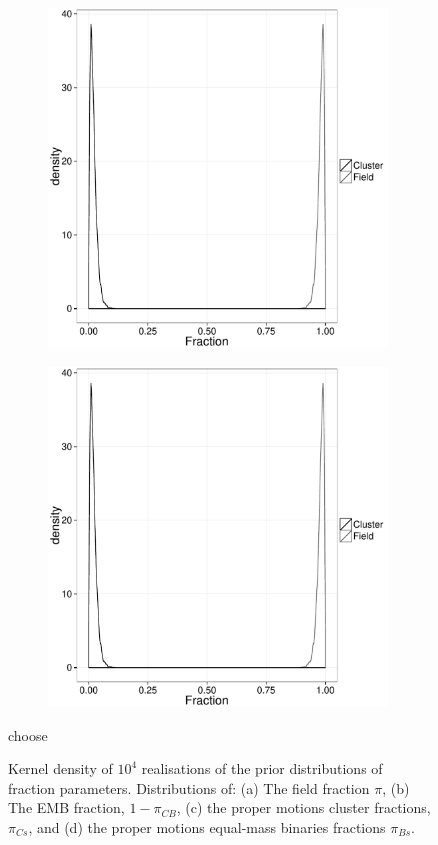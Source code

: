 \begin{figure}[ht!]
\begin{subfigure}[t]{0.48\textwidth}
        \caption{}
        \label{} 
    \end{subfigure}
     \begin{subfigure}[t]{0.48\textwidth}
      \includegraphics[page=3,height=9cm,width=\textwidth]{background/Figures/Priors.pdf}
        \caption{}
        \label{} 
    \end{subfigure}
     \begin{subfigure}[t]{0.48\textwidth}
      \includegraphics[page=4,height=9cm,width=\textwidth]{background/Figures/Priors.pdf}
        \caption{}
        \label{} 
    \end{subfigure}
\caption{Kernel density of $10^4$ realisations of the prior distributions of fraction parameters. Distributions of: (a) The field fraction $\pi$, (b) The EMB fraction, $1-\pi_{CB}$, (c) the proper motions cluster fractions, $\pi_{Cs}$, and (d) the proper motions equal-mass binaries fractions $\pi_{Bs}$.}
\label{figure:priors}choose
\end{figure}

